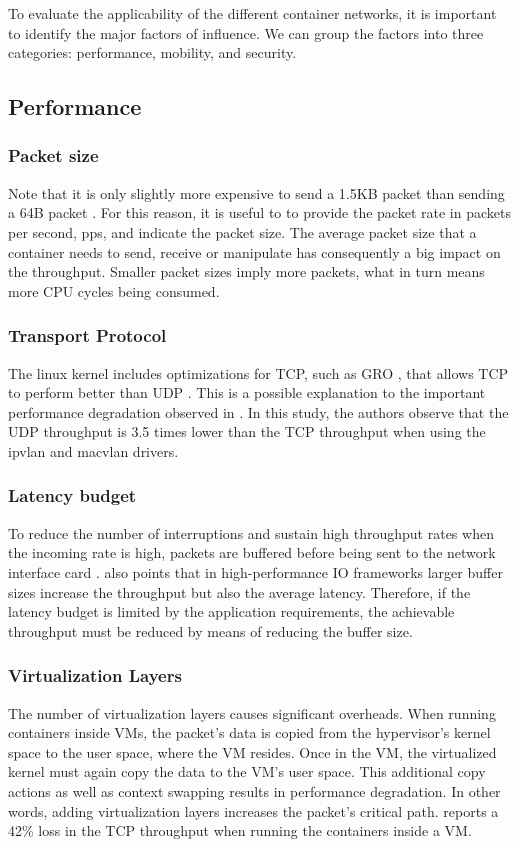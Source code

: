 \documentclass[conference]{IEEEtran}
\begin{document}
To evaluate the applicability of the different container networks, it is important to identify the major factors of influence. We can group the factors into three categories: performance, mobility, and security.

\subsection{Performance}

\subsubsection{Packet size}
Note that it is only slightly more expensive to send a 1.5KB packet than sending a 64B packet \cite{Rizzo:2012}. For this reason, it is useful to to provide the packet rate in packets per second, pps, and indicate the packet size. The average packet size that a container needs to send, receive or manipulate has consequently a big impact on the throughput. Smaller packet sizes imply more packets, what in turn means more CPU cycles being consumed.

\subsubsection{Transport Protocol}
The linux kernel includes optimizations for TCP, such as GRO \cite{GRO}, that allows TCP to perform better than UDP \cite{HotConNet_17:Zhao}. This is a possible explanation to the important performance degradation observed in \cite{NOMS_2016:Claasen}. In this study, the authors observe that the UDP throughput is 3.5 times lower than the TCP throughput when using the ipvlan and macvlan drivers.

\subsubsection{Latency budget}
To reduce the number of interruptions and sustain high throughput rates when the incoming rate is high,  packets are buffered before being sent to the network interface card \cite{DEBS_20:Stylianopoulos}. \cite{ANCS:Gallenmüller} also points that in high-performance IO frameworks larger buffer sizes increase the throughput but also the average latency. Therefore, if the latency budget is limited by the application requirements, the achievable throughput must be reduced by means of reducing the buffer size.
\subsubsection{Virtualization Layers}
The number of virtualization layers causes significant overheads. When running containers inside VMs, the packet's data is copied from the hypervisor's kernel space to the user space, where the VM resides. Once in the VM, the virtualized kernel must again copy the data to the VM’s user space. This additional copy actions as well as context swapping results in performance degradation. In other words, adding virtualization layers increases the packet's critical path. \cite{IEEE_INFOCOM_2018:K. Suo} reports a 42\% loss in the TCP throughput when running the containers inside a VM.
\end{document}
